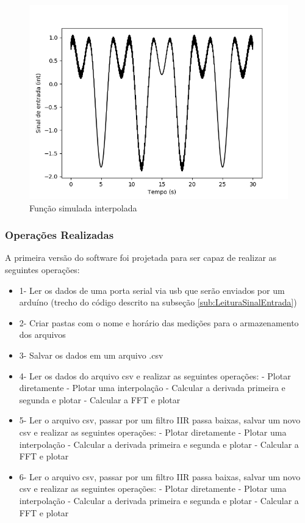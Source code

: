 \begin{figure}[h!]
	\begin{center}
		\includegraphics[width=0.5\linewidth]{images/Funcao_simulada_interpolada.png}
		\caption{Função simulada interpolada}
		\label{fig:Funcao_simulada_interpolada}
	\end{center}
\end{figure}



\subsubsection{Operações Realizadas}

A primeira versão do software foi projetada para ser capaz de realizar as seguintes operações:

\begin{itemize}[label=]
	\item 1- Ler os dados de uma porta serial via usb que serão enviados por um arduíno (trecho do código descrito na subseção \ref{sub:LeituraSinalEntrada})     
	\item     2- Criar pastas com o nome e horário das medições para o armazenamento dos arquivos
	\item     3- Salvar os dados em um arquivo .csv     
	\item     4- Ler os dados do arquivo csv e realizar as seguintes operações:     
	- Plotar diretamente
	- Plotar uma interpolação
	- Calcular a derivada primeira e segunda e plotar
	- Calcular a FFT e plotar    
	\item     5- Ler o arquivo csv, passar por um filtro IIR passa baixas, salvar um novo csv e realizar as seguintes operações:     
	- Plotar diretamente
	- Plotar uma interpolação
	- Calcular a derivada primeira e segunda e plotar
	- Calcular a FFT e plotar     
	\item     6- Ler o arquivo csv, passar por um filtro IIR passa baixas, salvar um novo csv e realizar as seguintes operações:        
	- Plotar diretamente
	- Plotar uma interpolação
	- Calcular a derivada primeira e segunda e plotar
	- Calcular a FFT e plotar     	 
\end{itemize} 

